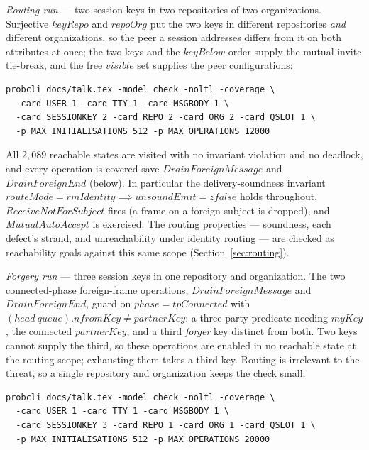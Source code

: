 \documentclass[a4paper,10pt,fleqn]{article}
\begin{document}
\emph{Routing run} --- two session keys in two repositories of two
organizations.  Surjective $keyRepo$ and $repoOrg$ put the two keys in
different repositories \emph{and} different organizations, so the peer a
session addresses differs from it on both attributes at once; the two
keys and the $keyBelow$ order supply the mutual-invite tie-break, and the
free $visible$ set supplies the peer configurations:

\begin{verbatim}
probcli docs/talk.tex -model_check -noltl -coverage \
  -card USER 1 -card TTY 1 -card MSGBODY 1 \
  -card SESSIONKEY 2 -card REPO 2 -card ORG 2 -card QSLOT 1 \
  -p MAX_INITIALISATIONS 512 -p MAX_OPERATIONS 12000
\end{verbatim}

All $2{,}089$ reachable states are visited with no invariant violation
and no deadlock, and every operation is covered save $DrainForeignMessage$
and $DrainForeignEnd$ (below).  In particular the delivery-soundness
invariant $routeMode = rmIdentity \implies unsoundEmit = zfalse$ holds
throughout, $ReceiveNotForSubject$ fires (a frame on a foreign subject is
dropped), and $MutualAutoAccept$ is exercised.  The routing properties ---
soundness, each defect's strand, and unreachability under identity
routing --- are checked as reachability goals against this same scope
(Section~\ref{sec:routing}).

\emph{Forgery run} --- three session keys in one repository and
organization.  The two connected-phase foreign-frame operations,
$DrainForeignMessage$ and $DrainForeignEnd$, guard on $phase =
tpConnected$ with $(head~queue).nfromKey \neq partnerKey$: a three-party
predicate needing $myKey$, the connected $partnerKey$, and a third
\emph{forger} key distinct from both.  Two keys cannot supply the third,
so these operations are enabled in no reachable state at the routing
scope; exhausting them takes a third key.  Routing is irrelevant to the
threat, so a single repository and organization keeps the check small:

\begin{verbatim}
probcli docs/talk.tex -model_check -noltl -coverage \
  -card USER 1 -card TTY 1 -card MSGBODY 1 \
  -card SESSIONKEY 3 -card REPO 1 -card ORG 1 -card QSLOT 1 \
  -p MAX_INITIALISATIONS 512 -p MAX_OPERATIONS 20000
\end{verbatim}
\end{document}
